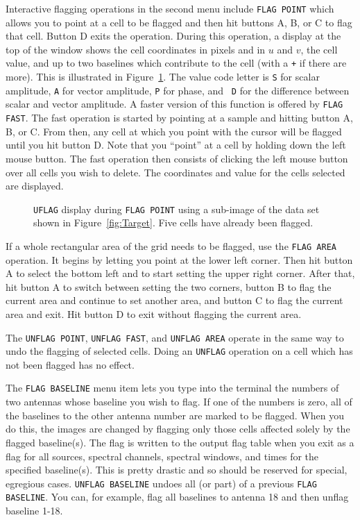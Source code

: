 \documentclass[twoside]{article}
\newcommand{\putfig}[1]{\texttt{[image: \#1]}}
\begin{document}
Interactive flagging operations in the second menu include {\tt FLAG
  POINT} which allows you to point at a cell to be flagged and then
hit buttons A, B, or C to flag that cell.  Button D exits the
operation.  During this operation, a display at the top of the window
shows the cell coordinates in pixels and in $u$ and $v$, the cell
value, and up to two baselines which contribute to the cell (with a
{\tt +} if there are more).  This is illustrated in
Figure~\ref{fig:Flag}.  The value code letter is {\tt S} for scalar
amplitude, {\tt A} for vector amplitude, {\tt P} for phase, and {\tt
  D} for the difference between scalar and vector amplitude.  A faster
version of this function is offered by {\tt FLAG FAST}\@.  The fast
operation is started by pointing at a sample and hitting button A, B,
or C.  From then, any cell at which you point with the cursor will be
flagged until you hit button D.  Note that you ``point'' at a cell by
holding down the left mouse button.  The fast operation then consists
of clicking the left mouse button over all cells you wish to delete.
The coordinates and value for the cells selected are displayed.

\begin{figure}
\begin{center}
\resizebox{6.5in}{!}{\putfig{Flag.eps}}
\caption{{\tt UFLAG} display during {\tt FLAG POINT} using a sub-image
  of the data set shown in Figure~\ref{fig:Target}.  Five cells have
  already been flagged.}
\label{fig:Flag}
\end{center}
\end{figure}

If a whole rectangular area of the grid needs to be flagged, use the
{\tt FLAG AREA} operation.  It begins by letting you point at the
lower left corner.  Then hit button A to select the bottom left and to
start setting the upper right corner. After that, hit button A to
switch between setting the two corners, button B to flag the current
area and continue to set another area, and button C to flag the
current area and exit.  Hit button D to exit without flagging the
current area.

The {\tt UNFLAG POINT}, {\tt UNFLAG FAST}, and {\tt UNFLAG AREA}
operate in the same way to undo the flagging of selected cells.  Doing
an {\tt UNFLAG} operation on a cell which has not been flagged has no
effect.

The {\tt FLAG BASELINE} menu item lets you type into the terminal the
numbers of two antennas whose baseline you wish to flag.  If one of
the numbers is zero, all of the baselines to the other antenna number
are marked to be flagged.  When you do this, the images are changed
by flagging only those cells affected solely by the flagged
baseline(s).  The flag is written to the output flag table when you
exit as a flag for all sources, spectral channels, spectral windows,
and times for the specified baseline(s).  This is pretty drastic and
so should be reserved for special, egregious cases. {\tt UNFLAG
  BASELINE} undoes all (or part) of a previous {\tt FLAG BASELINE}.
You can, for example, flag all baselines to antenna 18 and then unflag
baseline 1-18.
\end{document}
